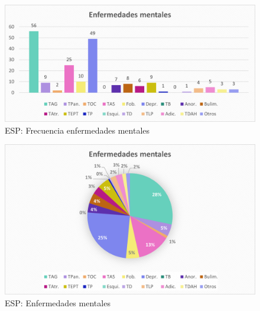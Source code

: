 \documentclass[12pt, a4paper,twoside,titlepage]{book}
\begin{document}
\begin{figure}
    \centering
    \includegraphics[width=.8\linewidth]{ANEXO ESP/22AnexESPEnf}
    \caption{ESP: Frecuencia enfermedades mentales}
    \label{fig:ESPTenidas}
\end{figure}
\begin{figure}
    \centering
    \includegraphics[width=.8\linewidth]{ANEXO ESP/23AnexESPEnf}
    \caption{ESP: Enfermedades mentales}
    \label{fig:ESPTenidaspor}
\end{figure}
\end{document}

